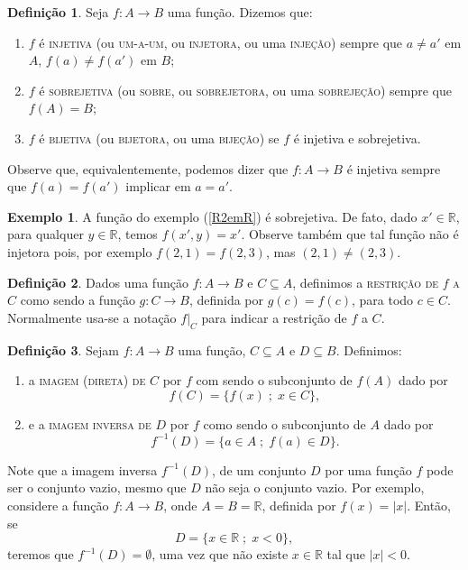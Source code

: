 \documentclass[a4paper,12pt]{monografia}
\theoremstyle{plain}
\theoremstyle{definition}
\newtheorem{definition}{Definição}[section]
\newtheorem{example}{Exemplo}[section]
\theoremstyle{remark}
\newcommand{\R}{\mathbb{R}}
\begin{document}
\begin{definition}
Seja $f:A \rightarrow B$ uma função. Dizemos que:
\begin{enumerate}
    \item $f$ é \textsc{injetiva} (ou \textsc{um-a-um}, ou \textsc{injetora}, ou uma
    \textsc{injeção}) sempre que $a \neq a'$ em $A$, $f(a)\neq
    f(a')$ em $B$;
    \item $f$ é \textsc{sobrejetiva} (ou \textsc{sobre}, ou \textsc{sobrejetora}, ou uma
    \textsc{sobrejeção}) sempre que $f(A)=B$;
    \item $f$ é  \textsc{bijetiva} (ou \textsc{bijetora}, ou uma \textsc{bijeção}) se $f$
    é injetiva e sobrejetiva.
\end{enumerate}
\end{definition}

Observe que, equivalentemente, podemos dizer que $f:A \rightarrow
B$ é injetiva sempre que $f(a)=f(a')$ implicar em $a=a'$.

\begin{example}
A função do exemplo (\ref{R2emR}) é sobrejetiva. De fato, dado $x'
\in \R$, para qualquer $y \in \R$, temos $f(x',y)=x'$. Observe
também que tal função não é injetora pois, por exemplo
$f(2,1)=f(2,3)$, mas $(2,1)\neq (2,3)$.
\end{example}
\begin{definition}
Dados uma função $f:A \rightarrow B$ e $C\subseteq A$, definimos a
\textsc{restrição de} $f$ \textsc{a} $C$ como sendo a função $g:C
\rightarrow B$, definida por $g(c)=f(c)$, para todo $c \in C$.
Normalmente usa-se a notação $f|_C$ para indicar a restrição de
$f$ a $C$.
\end{definition}
\begin{definition}
Sejam $f:A \rightarrow B$ uma função, $C \subseteq A$ e $D
\subseteq B$. Definimos:
\begin{enumerate}
    \item a \textsc{imagem (direta) de} $C$ por $f$ com sendo o subconjunto
    de $f(A)$ dado por
    $$
     f(C)=\{f(x)\;;\; x \in C \},
    $$
    \item  e a \textsc{imagem inversa de} $D$ por $f$ como sendo o subconjunto
    de $A$ dado por
    $$
    f^{-1}(D)=\{a \in A\;;\; f(a) \in D \}.
    $$
\end{enumerate}
\end{definition}

Note que a imagem inversa $f^{-1}(D)$, de um conjunto $D$ por uma
função $f$ pode ser o conjunto vazio, mesmo que $D$ não seja o
conjunto vazio. Por exemplo, considere a função $f:A \rightarrow
B$, onde $A=B=\R$, definida por $f(x)=|x|$. Então, se $$D=\{x \in
\R\;;\; x<0\},$$ teremos que $f^{-1}(D)=\emptyset$, uma vez que
não existe $x \in \R$ tal que $|x|<0$.
\end{document}
